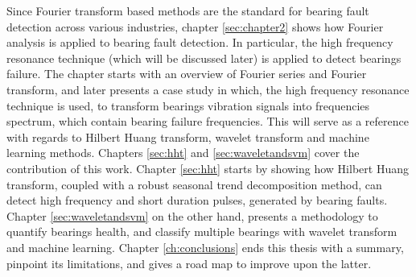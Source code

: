 \documentclass[../Main/thesis.tex]{subfiles}
\begin{document}
\justify
Since Fourier transform based methods are the standard for bearing fault detection across various industries, chapter \ref{sec:chapter2} shows how Fourier analysis is applied to bearing fault detection. In particular, the high frequency resonance technique (which will be discussed later) is applied to detect bearings failure. The chapter starts with an overview of Fourier series and Fourier transform, and later presents a case study in which, the high frequency resonance technique is used, to transform bearings vibration signals into frequencies spectrum, which contain bearing failure frequencies.
This will serve as a reference with regards to Hilbert Huang transform, wavelet transform and machine learning methods.
\justify
Chapters \ref{sec:hht} and \ref{sec:waveletandsvm} cover the contribution of this work. Chapter \ref{sec:hht} starts by showing how Hilbert Huang transform, coupled with a robust seasonal trend decomposition method, can detect high frequency and short duration pulses, generated by bearing faults. Chapter \ref{sec:waveletandsvm} on the other hand, presents a methodology to quantify bearings health, and classify multiple bearings with wavelet transform and machine learning. Chapter \ref{ch:conclusions} ends this thesis with a summary, pinpoint its limitations, and gives a road map to improve upon the latter.

\clearpage
\end{document}
